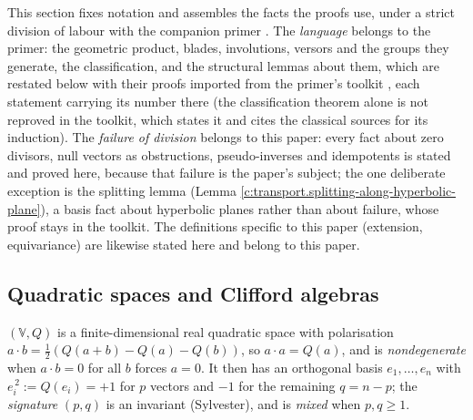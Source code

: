 \documentclass[11pt]{article}
\theoremstyle{definition}
\theoremstyle{plain}
\begin{document}
\label{c:note.transport.setting-setting-classical-facts-proofs-use}
This section fixes notation and assembles the facts the proofs use, under a strict division of labour with the companion primer \cite{ButlerT0}. The \emph{language} belongs to the primer: the geometric product, blades, involutions, versors and the groups they generate, the classification, and the structural lemmas about them, which are restated below with their proofs imported from the primer's toolkit \cite[Section 9]{ButlerT0}, each statement carrying its number there (the classification theorem alone is not reproved in the toolkit, which states it and cites the classical sources for its induction). The \emph{failure of division} belongs to this paper: every fact about zero divisors, null vectors as obstructions, pseudo-inverses and idempotents is stated and proved here, because that failure is the paper's subject; the one deliberate exception is the splitting lemma (Lemma \ref{c:transport.splitting-along-hyperbolic-plane}), a basis fact about hyperbolic planes rather than about failure, whose proof stays in the toolkit. The definitions specific to this paper (extension, equivariance) are likewise stated here and belong to this paper.

\subsection*{Quadratic spaces and Clifford algebras}
\label{c:note.transport.setting-quadratic-spaces-clifford-algebras}
$(\mathbb{V}, Q)$ is a finite-dimensional real quadratic space with polarisation $a \cdot b = \tfrac12(Q(a+b) - Q(a) - Q(b))$, so $a \cdot a = Q(a)$, and is \emph{nondegenerate} when $a \cdot b = 0$ for all $b$ forces $a = 0$. It then has an orthogonal basis $e_1, \dots, e_n$ with $e_i^{\,2} \mathrel{:=} Q(e_i) = +1$ for $p$ vectors and $-1$ for the remaining $q = n-p$; the \emph{signature} $(p,q)$ is an invariant (Sylvester), and is \emph{mixed} when $p, q \geq 1$.
\end{document}
